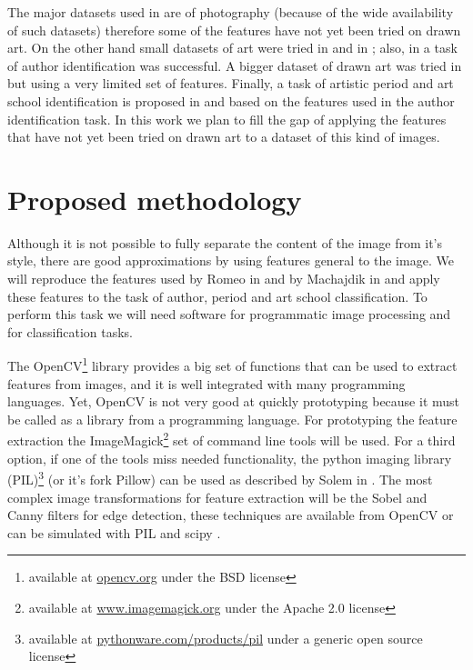 \documentclass[a4paper]{article}
\begin{document}
The major datasets used in \cite{jma12clas,mach10clas} are of photography
(because of the wide availability of such datasets) therefore some of the
features have not yet been tried on drawn art.  On the other hand small
datasets of art were tried in \cite{mach10clas} and in \cite{rmc12ajs};  also,
in \cite{rmc12ajs} a task of author identification was successful.  A bigger
dataset of drawn art was tried in \cite{zirnhelt07art} but using a very limited
set of features.  Finally, a task of artistic period and art school
identification is proposed in \cite{zirnhelt07art} and \cite{rmc12ajs} based on
the features used in the author identification task.  In this work we plan to
fill the gap of applying the features that have not yet been tried on drawn art
to a dataset of this kind of images.

\section{Proposed methodology}

Although it is not possible to fully separate the content of the image from
it's style, there are good approximations by using features general to the
image.  We will reproduce the features used by Romeo in \cite{rmc12ajs} and by
Machajdik in \cite{mach10clas} and apply these features to the task of author,
period and art school classification.  To perform this task we will need
software for programmatic image processing and for classification tasks.

The OpenCV\footnote{available at \href{http://opencv.org/}{opencv.org} under
the BSD license} library provides a big set of functions that can be used to
extract features from images, and it is well integrated with many programming
languages.  Yet, OpenCV is not very good at quickly prototyping because it must
be called as a library from a programming language.  For prototyping the
feature extraction the ImageMagick\footnote{available at
\href{http://www.imagemagick.org/}{www.imagemagick.org} under the Apache 2.0
license} set of command line tools will be used.  For a third option, if one of
the tools miss needed functionality, the python imaging library
(PIL)\footnote{available at
\href{http://pythonware.com/products/pil/}{pythonware.com/products/pil} under a
generic open source license} (or it's fork Pillow) can be used as described by
Solem in \cite{solem12book}.  The most complex image transformations for
feature extraction will be the Sobel and Canny filters for edge detection,
these techniques are available from OpenCV or can be simulated with PIL and
scipy \cite{oliphant06numpy}.
\end{document}
